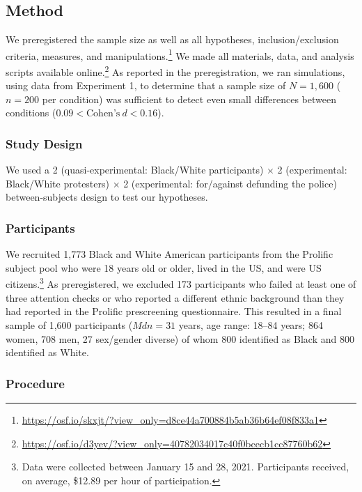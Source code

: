 \documentclass[twocolumn, 11pt, letterpaper]{article}
\begin{document}
\hypertarget{method-1}{%
\subsection{Method}\label{method-1}}

We preregistered the sample size as well as all hypotheses,
inclusion/exclusion criteria, measures, and manipulations.\footnote{\url{https://osf.io/skxjt/?view_only=d8ce44a700884b5ab36b64ef08f833a1}}
We made all materials, data, and analysis scripts available
online.\footnote{\url{https://osf.io/d3yev/?view_only=40782034017c40f0bcecb1cc87760b62}}
As reported in the preregistration, we ran simulations, using data from
Experiment 1, to determine that a sample size of \(N = 1,600\)
(\(n = 200\) per condition) was sufficient to detect even small
differences between conditions (\(0.09 < \text{Cohen's}~d < 0.16\)).

\hypertarget{study-design-1}{%
\subsubsection{Study Design}\label{study-design-1}}

We used a 2 (quasi-experimental: Black/White participants) \(\times\) 2
(experimental: Black/White protesters) \(\times\) 2 (experimental:
for/against defunding the police) between-subjects design to test our
hypotheses.

\hypertarget{participants-1}{%
\subsubsection{Participants}\label{participants-1}}

We recruited 1,773 Black and White American participants from the
Prolific subject pool who were 18 years old or older, lived in the US,
and were US citizens.\footnote{Data were collected between January 15
  and 28, 2021. Participants received, on average, \$12.89 per hour of
  participation.} As preregistered, we excluded 173 participants who
failed at least one of three attention checks or who reported a
different ethnic background than they had reported in the Prolific
prescreening questionnaire. This resulted in a final sample of 1,600
participants (\(\textit{Mdn} = 31\) years, age range: 18--84 years; 864
women, 708 men, 27 sex/gender diverse) of whom 800 identified as Black
and 800 identified as White.

\hypertarget{procedure-1}{%
\subsubsection{Procedure}\label{procedure-1}}
\end{document}

